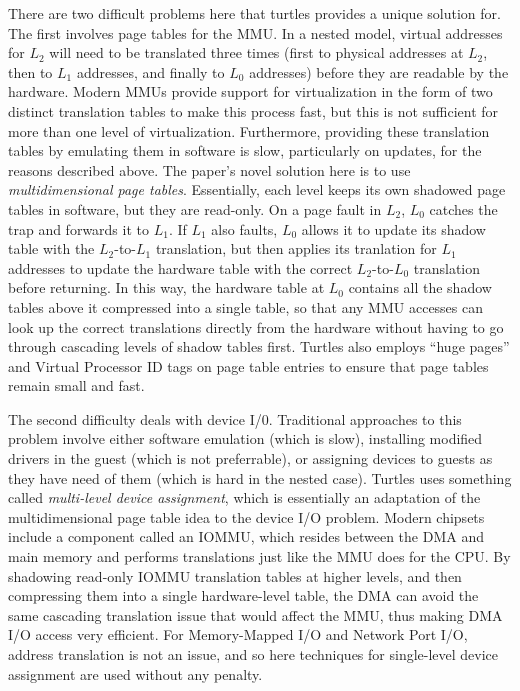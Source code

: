 \documentclass[letterpaper, twocolumn]{article}
\begin{document}
There are two difficult problems here that turtles provides a unique solution for.
The first involves page tables for the MMU.  In a nested model, virtual addresses for $L_2$
will need to be translated three times (first to physical addresses at $L_2$, then to $L_1$
addresses, and finally to $L_0$ addresses)
before they are readable by the hardware.  Modern MMUs provide support for virtualization
in the form of two distinct translation tables to make this process fast, but this is not
sufficient for more than one level of virtualization.  Furthermore, providing these
translation tables by emulating them in software is slow, particularly on updates,
for the reasons described above.  The paper's novel solution here is to use
\emph{multidimensional page tables}.  Essentially, each level keeps its own
shadowed page tables in software, but they are read-only.  On a page fault in $L_2$,
$L_0$ catches the trap and forwards it to $L_1$.  If $L_1$ also faults, $L_0$ allows
it to update its shadow table with the $L_2$-to-$L_1$ translation, but then applies
its tranlation for $L_1$ addresses to update the hardware table with the correct
$L_2$-to-$L_0$ translation before returning.  In this way, the hardware table at $L_0$
contains all the shadow tables above it compressed into a single table, so that
any MMU accesses can look up the correct translations directly from the hardware
without having to go through cascading levels of shadow tables first.  Turtles
also employs ``huge pages'' and Virtual Processor ID tags on page table entries
to ensure that page tables remain small and fast.

The second difficulty deals with device I/0.  Traditional approaches to this problem
involve either software emulation (which is slow), installing modified drivers in the
guest (which is not preferrable), or assigning devices to guests as they have need
of them (which is hard in the nested case).  Turtles uses something called
\emph{multi-level device assignment}, which is essentially an adaptation of the
multidimensional page table idea to the device I/O problem.  Modern chipsets
include a component called an IOMMU, which resides between the DMA and main memory
and performs translations just like the MMU does for the CPU.  By shadowing read-only
IOMMU translation tables at higher levels, and then compressing them into a single
hardware-level table, the DMA can avoid the same cascading translation issue that
would affect the MMU, thus making DMA I/O access very efficient.  For Memory-Mapped I/O
and Network Port I/O, address translation is not an issue, and so here techniques for
single-level device assignment are used without any penalty.
\end{document}
